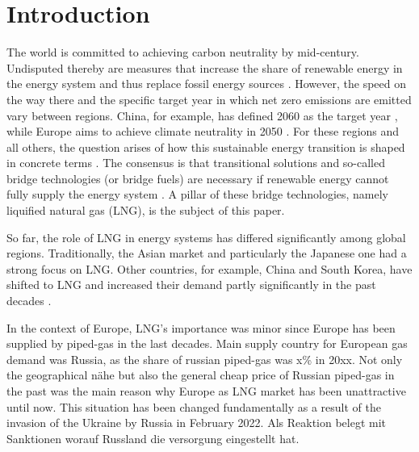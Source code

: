 \section{Introduction}
The world is committed to achieving carbon neutrality by mid-century. Undisputed thereby are measures that increase the share of renewable energy in the energy system and thus replace fossil energy sources \cite{yuan2022race}. However, the speed on the way there and the specific target year in which net zero emissions are emitted vary between regions. China, for example, has defined 2060 as the target year \cite{jia2021achieve}, while Europe aims to achieve climate neutrality in 2050 \cite{wolf2021european}. For these regions and all others, the question arises of how this sustainable energy transition is shaped in concrete terms \cite{capros2018outlook}. The consensus is that transitional solutions and so-called bridge technologies (or bridge fuels) are necessary if renewable energy cannot fully supply the energy system \cite{gursan2021systemic}. A pillar of these bridge technologies, namely liquified natural gas (LNG), is the subject of this paper.\vspace{0.35cm}                
           
So far, the role of LNG in energy systems has differed significantly among global regions. Traditionally, the Asian market and particularly the Japanese one had a strong focus on LNG. Other countries, for example, China and South Korea, have shifted to LNG and increased their demand partly significantly in the past decades \cite{aguilera2014role}.    



In the context of Europe, LNG's importance was minor since Europe has been supplied by piped-gas in the last decades. Main supply country for European gas demand was Russia, as the share of russian piped-gas was x\% in 20xx. Not only the geographical nähe but also the general cheap price of Russian piped-gas in the past was the main reason why Europe as LNG market has been unattractive until now. This situation has been changed fundamentally as a result of the invasion of the Ukraine by Russia in February 2022. Als Reaktion belegt mit Sanktionen worauf Russland die versorgung eingestellt hat. 
           





